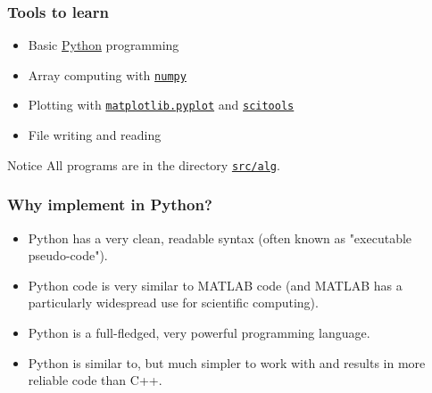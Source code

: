 \documentclass{beamer}
\begin{document}
\begin{frame}
\frametitle{Tools to learn}

\begin{itemize}
  \item Basic \href{{http://python.org}}{Python} programming

  \item Array computing with \href{{http://numpy.org/}}{\nolinkurl{numpy}}

  \item Plotting with \href{{http://matplotlib.sourceforge.net/}}{\nolinkurl{matplotlib.pyplot}} and \href{{https://github.com/hplgit/scitools/}}{\nolinkurl{scitools}}

  \item File writing and reading
\end{itemize}

\noindent
\begin{block}{Notice}
All programs are in the directory
\href{{http://tinyurl.com/ofkw6kc/alg}}{\nolinkurl{src/alg}}.
\end{block}
\end{frame}

\begin{frame}
\frametitle{Why implement in Python?}

\begin{itemize}
  \item Python has a very clean, readable syntax (often known as
    "executable pseudo-code").

  \item Python code is very similar to MATLAB code (and MATLAB has a
    particularly widespread use for scientific computing).

  \item Python is a full-fledged, very powerful programming language.

  \item Python is similar to, but much simpler to work with and
    results in more reliable code than C++.
\end{itemize}

\noindent
\end{frame}
\end{document}
